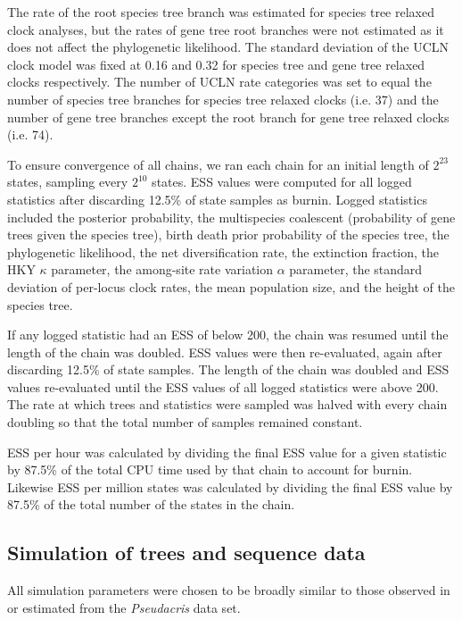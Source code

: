 \documentclass[12pt]{article}
\begin{document}
The rate of the root species tree branch was estimated for species tree relaxed
clock analyses, but the rates of gene tree root branches were not estimated as
it does not affect the phylogenetic likelihood. The standard deviation of the
UCLN clock model was fixed at 0.16 and 0.32 for species tree and gene tree
relaxed clocks respectively. The number of UCLN rate categories was set to equal
the number of species tree branches for species tree relaxed clocks (i.e. 37)
and the number of gene tree branches except the root branch for gene tree
relaxed clocks (i.e. 74).

To ensure convergence of all chains, we ran each chain for an initial length of
$2^{23}$ states, sampling every $2^{10}$ states. ESS values were computed for
all logged statistics after discarding 12.5\% of state samples as burnin. Logged
statistics included the posterior probability, the multispecies coalescent
(probability of gene trees given the species tree), birth death prior
probability of the species tree, the phylogenetic likelihood, the net
diversification rate, the extinction fraction, the HKY $\kappa$ parameter, the
among-site rate variation $\alpha$ parameter, the standard deviation of
per-locus clock rates, the mean population size, and the height of the species tree.

If any logged statistic had an ESS of below 200, the chain was resumed until the
length of the chain was doubled. ESS values were then re-evaluated, again after
discarding 12.5\% of state samples. The length of the chain was doubled and ESS
values re-evaluated until the ESS values of all logged statistics were above
200. The rate at which trees and statistics were sampled was halved with every chain
doubling so that the total number of samples remained constant.

ESS per hour was calculated by dividing the final ESS value for a given
statistic by 87.5\% of the total CPU time used by that chain to account for
burnin. Likewise ESS per million states was calculated by dividing the final ESS
value by 87.5\% of the total number of the states in the chain.

\subsection*{Simulation of trees and sequence data}

All simulation parameters were chosen to be broadly similar to those observed in
or estimated from the \textit{Pseudacris} data set.
\end{document}
